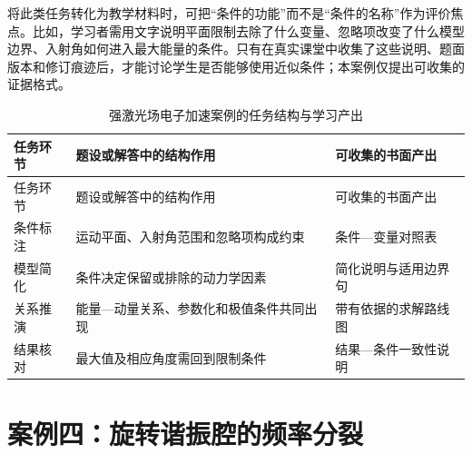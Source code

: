 \documentclass[
  12pt,
  a4paper,twoside,openany]{ctexbook}
\begin{document}
将此类任务转化为教学材料时，可把``条件的功能''而不是``条件的名称''作为评价焦点。比如，学习者需用文字说明平面限制去除了什么变量、忽略项改变了什么模型边界、入射角如何进入最大能量的条件。只有在真实课堂中收集了这些说明、题面版本和修订痕迹后，才能讨论学生是否能够使用近似条件；本案例仅提出可收集的证据格式。

\begin{longtable}[]{@{}
  >{\raggedright\arraybackslash}p{}
  >{\raggedright\arraybackslash}p{}
  >{\raggedright\arraybackslash}p{}@{}}
\caption{强激光场电子加速案例的任务结构与学习产出}\tabularnewline
\toprule\noalign{}
\rowcolor{ThesisPale}
\begin{minipage}[b]{\linewidth}\raggedright
任务环节
\end{minipage} & \begin{minipage}[b]{\linewidth}\raggedright
题设或解答中的结构作用
\end{minipage} & \begin{minipage}[b]{\linewidth}\raggedright
可收集的书面产出
\end{minipage} \\
\midrule\noalign{}
\endfirsthead
\toprule\noalign{}
\rowcolor{ThesisPale}
\begin{minipage}[b]{\linewidth}\raggedright
任务环节
\end{minipage} & \begin{minipage}[b]{\linewidth}\raggedright
题设或解答中的结构作用
\end{minipage} & \begin{minipage}[b]{\linewidth}\raggedright
可收集的书面产出
\end{minipage} \\
\midrule\noalign{}
\endhead
\bottomrule\noalign{}
\endlastfoot
条件标注 & 运动平面、入射角范围和忽略项构成约束 & 条件---变量对照表 \\
模型简化 & 条件决定保留或排除的动力学因素 & 简化说明与适用边界句 \\
关系推演 & 能量---动量关系、参数化和极值条件共同出现 &
带有依据的求解路线图 \\
结果核对 & 最大值及相应角度需回到限制条件 & 结果---条件一致性说明 \\
\end{longtable}

\section{案例四：旋转谐振腔的频率分裂}\label{ux6848ux4f8bux56dbux65cbux8f6cux8c10ux632fux8154ux7684ux9891ux7387ux5206ux88c2}
\end{document}
